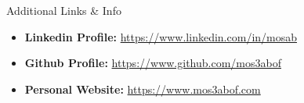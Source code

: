 \documentclass[]{mosabcv}
\begin{document}
	\begin{cvsection}{Additional Links \& Info}
		\begin{cvsubsection}{}{}{}	
			\begin{itemize}
				\item \textbf{Linkedin Profile:} \href{https://www.linkedin.com/in/mosab}{https://www.linkedin.com/in/mosab}
				\item \textbf{Github Profile:} \href{https://www.github.com/mos3abof}{https://www.github.com/mos3abof}
				\item \textbf{Personal Website:} \href{https://www.mos3abof.com}{https://www.mos3abof.com}
			\end{itemize}
		\end{cvsubsection}
	\end{cvsection}
\end{document}
